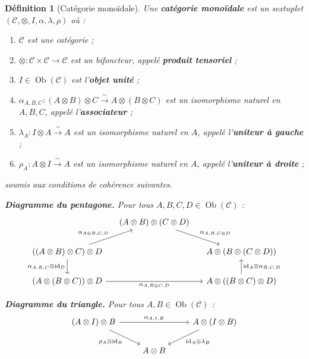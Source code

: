 \documentclass[a4paper,12pt]{book}
\DeclareMathOperator{\Ob}{Ob}
\newcommand{\id}{\mathrm{id}}
\newtheorem{definition}[theoreme]{Définition}
\begin{document}
\begin{definition}[Catégorie monoïdale]\label{def:cat-monoidale}
Une \textbf{catégorie monoïdale} est un sextuplet
$(\mathcal{C}, \otimes, I, \alpha, \lambda, \rho)$ où :
\begin{enumerate}[label=(\roman*)]
\item $\mathcal{C}$ est une catégorie ;
\item $\otimes \colon \mathcal{C} \times \mathcal{C} \to \mathcal{C}$
      est un bifoncteur, appelé \textbf{produit tensoriel} ;
\item $I \in \Ob(\mathcal{C})$ est l'\textbf{objet unité} ;
\item $\alpha_{A,B,C} \colon (A \otimes B) \otimes C
      \xrightarrow{\;\sim\;} A \otimes (B \otimes C)$
      est un isomorphisme naturel en $A, B, C$,
      appelé l'\textbf{associateur} ;
\item $\lambda_A \colon I \otimes A \xrightarrow{\;\sim\;} A$
      est un isomorphisme naturel en $A$,
      appelé l'\textbf{uniteur à gauche} ;
\item $\rho_A \colon A \otimes I \xrightarrow{\;\sim\;} A$
      est un isomorphisme naturel en $A$,
      appelé l'\textbf{uniteur à droite} ;
\end{enumerate}
soumis aux conditions de cohérence suivantes.

\medskip
\noindent\textbf{Diagramme du pentagone.}
Pour tous $A, B, C, D \in \Ob(\mathcal{C})$ :
\[
\begin{tikzcd}[column sep=small]
& (A \otimes B) \otimes (C \otimes D)
  \arrow[dr, "\alpha_{A,B,C \otimes D}"] & \\
((A \otimes B) \otimes C) \otimes D
  \arrow[ur, "\alpha_{A \otimes B,C,D}"]
  \arrow[d, "\alpha_{A,B,C} \otimes \id_D"'] & &
A \otimes (B \otimes (C \otimes D)) \\
(A \otimes (B \otimes C)) \otimes D
  \arrow[rr, "\alpha_{A,B \otimes C,D}"'] & &
A \otimes ((B \otimes C) \otimes D)
  \arrow[u, "\id_A \otimes \alpha_{B,C,D}"']
\end{tikzcd}
\]

\noindent\textbf{Diagramme du triangle.}
Pour tous $A, B \in \Ob(\mathcal{C})$ :
\[
\begin{tikzcd}
(A \otimes I) \otimes B
  \arrow[rr, "\alpha_{A,I,B}"]
  \arrow[dr, "\rho_A \otimes \id_B"'] & &
A \otimes (I \otimes B)
  \arrow[dl, "\id_A \otimes \lambda_B"] \\
& A \otimes B &
\end{tikzcd}
\]
\end{definition}
\end{document}
